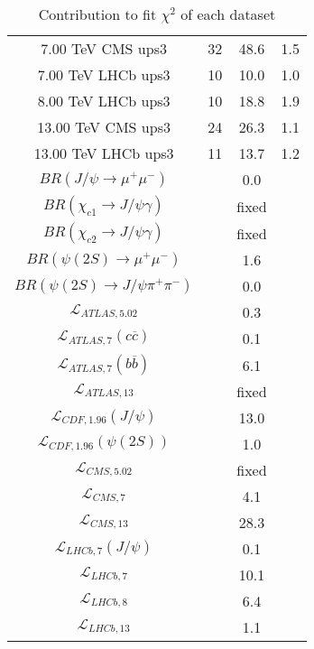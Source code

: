 \begin{table}[h!]
\begin{tabular}{c|c|c|c}
7.00 TeV CMS ups3 & 32 & 48.6 & 1.5 \\
7.00 TeV LHCb ups3 & 10 & 10.0 & 1.0 \\
8.00 TeV LHCb ups3 & 10 & 18.8 & 1.9 \\
13.00 TeV CMS ups3 & 24 & 26.3 & 1.1 \\
13.00 TeV LHCb ups3 & 11 & 13.7 & 1.2 \\
\hline
$BR(J/\psi\rightarrow\mu^+\mu^-)$ &  & 0.0 &  \\
$BR(\chi_{c1}\rightarrow J/\psi\gamma)$ &  & fixed & \\
$BR(\chi_{c2}\rightarrow J/\psi\gamma)$ &  & fixed & \\
$BR(\psi(2S)\rightarrow\mu^+\mu^-)$ &  & 1.6 &  \\
$BR(\psi(2S)\rightarrow J/\psi\pi^+\pi^-)$ &  & 0.0 &  \\
$\mathcal L_{ATLAS,5.02}$ &  & 0.3 &  \\
$\mathcal L_{ATLAS,7}(c\overline c)$ &  & 0.1 &  \\
$\mathcal L_{ATLAS,7}(b\overline b)$ &  & 6.1 &  \\
$\mathcal L_{ATLAS,13}$ &  & fixed & \\
$\mathcal L_{CDF,1.96}(J/\psi)$ &  & 13.0 &  \\
$\mathcal L_{CDF,1.96}(\psi(2S))$ &  & 1.0 &  \\
$\mathcal L_{CMS,5.02}$ &  & fixed & \\
$\mathcal L_{CMS,7}$ &  & 4.1 &  \\
$\mathcal L_{CMS,13}$ &  & 28.3 &  \\
$\mathcal L_{LHCb,7}(J/\psi)$ &  & 0.1 &  \\
$\mathcal L_{LHCb,7}$ &  & 10.1 &  \\
$\mathcal L_{LHCb,8}$ &  & 6.4 &  \\
$\mathcal L_{LHCb,13}$ &  & 1.1 &  \\
\end{tabular}
\caption{Contribution to fit $\chi^2$ of each dataset}
\end{table}
